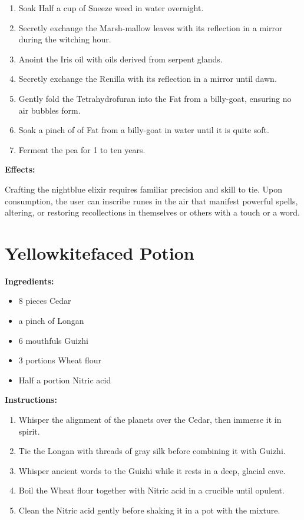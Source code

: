 \documentclass{article}
\begin{document}
\begin{enumerate}
  \item Soak Half a cup of Sneeze weed in water overnight.
  \item Secretly exchange the Marsh-mallow leaves with its reflection in a mirror during the witching hour.
  \item Anoint the Iris oil with oils derived from serpent glands.
  \item Secretly exchange the Renilla with its reflection in a mirror until dawn.
  \item Gently fold the Tetrahydrofuran into the Fat from a billy-goat, ensuring no air bubbles form.
  \item Soak a pinch of of Fat from a billy-goat in water until it is quite soft.
  \item Ferment the pea for 1 to ten years.
\end{enumerate}

\textbf{Effects:}

Crafting the nightblue elixir requires familiar precision and skill to tie. Upon consumption, the user can inscribe runes in the air that manifest powerful spells, altering, or restoring recollections in themselves or others with a touch or a word.

\newpage
\section*{Yellowkitefaced Potion}

\textbf{Ingredients:}

\begin{itemize}
  \item 8 pieces Cedar
  \item a pinch of Longan
  \item 6 mouthfuls Guizhi
  \item 3 portions Wheat flour
  \item Half a portion Nitric acid
\end{itemize}

\textbf{Instructions:}

\begin{enumerate}
  \item Whisper the alignment of the planets over the Cedar, then immerse it in spirit.
  \item Tie the Longan with threads of gray silk before combining it with Guizhi.
  \item Whisper ancient words to the Guizhi while it rests in a deep, glacial cave.
  \item Boil the Wheat flour together with Nitric acid in a crucible until opulent.
  \item Clean the Nitric acid gently before shaking it in a pot with the mixture.
\end{enumerate}
\end{document}

